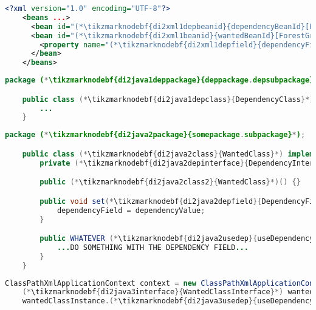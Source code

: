 \begin{lstlisting}[language=XML, title={Configuration XML}]
    <?xml version="1.0" encoding="UTF-8"?>
    <beans ...>
      <bean id="(*\tikzmarknodebf{di2xml1depbeanid}{dependencyBeanId}[ForestGreen]*)" class="(*\tikzmarknodebf{di2xml1deppackage}{deppackage.depsubpackage}[ForestGreen]*).(*\tikzmarknodebf{di2xml1depclass}{DependencyClass}[ForestGreen]*)"/>
      <bean id="(*\tikzmarknodebf{di2xml1beanid}{wantedBeanId}[ForestGreen]*)" class="(*\tikzmarknodebf{di2xml1package}{somepackage.subpackage}[ForestGreen]*).(*\tikzmarknodebf{di2xml1class}{WantedClass}[ForestGreen]*)">
        <property name="(*\tikzmarknodebf{di2xml1depfield}{dependencyField}[ForestGreen]*)" ref="(*\tikzmarknodebf{di2xml1depbeanid2}{dependencyBeanId}[ForestGreen]*)"/>
      </bean>
    </beans>
\end{lstlisting}
\begin{lstlisting}[language=Java, title={Dependency class}]
    package (*\tikzmarknodebf{di2java1deppackage}{deppackage.depsubpackage}*);

    public class (*\tikzmarknodebf{di2java1depclass}{DependencyClass}*) implements (*\tikzmarknodebf{di2java1depinterface}{DependencyInterface}*) {
        ...
    }
\end{lstlisting}
\begin{lstlisting}[language=Java, title={Wanted class with the zero--parameter constructor and the setter method}]
    package (*\tikzmarknodebf{di2java2package}{somepackage.subpackage}*);

    public class (*\tikzmarknodebf{di2java2class}{WantedClass}*) implements (*\tikzmarknodebf{di2java2interface}{WantedClassInterface}*) {
        private (*\tikzmarknodebf{di2java2depinterface}{DependencyInterface}*) dependencyField;

        public (*\tikzmarknodebf{di2java2class2}{WantedClass}*)() {}

        public void set(*\tikzmarknodebf{di2java2depfield}{DependencyField}*)((*\tikzmarknodebf{di2java2depinterface2}{DependencyInterface}*) dependencyValue) {
            dependencyField = dependencyValue;
        }

        public WHATEVER (*\tikzmarknodebf{di2java2usedep}{useDependency}*)() {
            ...DO SOMETHING WITH THE DEPENDENCY FIELD...
        }
    }
\end{lstlisting}
\begin{lstlisting}[language=Java, title={Usage}]
    ClassPathXmlApplicationContext context = new ClassPathXmlApplicationContext("configurationFile.xml");
    (*\tikzmarknodebf{di2java3interface}{WantedClassInterface}*) wantedClassInstance = context.getBean("(*\tikzmarknodebf{di2java3beanid}{wantedBeanId}[ForestGreen]*)", (*\tikzmarknodebf{di2java3interface2}{WantedClassInterface}*).class);
    wantedClassInstance.(*\tikzmarknodebf{di2java3usedep}{useDependency}*)();
\end{lstlisting}
